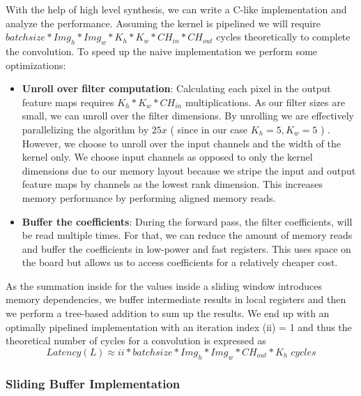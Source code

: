 With the help of high level synthesis, we can write a C-like implementation and analyze the performance. Assuming the kernel is pipelined we will require $ batch size * Img_h * Img_w * K_h * K_w * CH_{in} * CH_{out}  $ cycles theoretically to complete the convolution. To speed up the naive implementation we perform some optimizations:

\begin{itemize}
\item
\textbf{Unroll over filter computation}: Calculating each pixel in the output feature maps requires $ K_h * K_w * CH_{in} $ multiplications. As our filter sizes are small, we can unroll over the filter dimensions. By unrolling we are effectively parallelizing the algorithm by $ \mathit{25x} $ ( since in our case $ K_h = 5, K_w=5 $ ) . However, we choose to unroll over the input channels and the width of the kernel only. We choose input channels as opposed to only the kernel dimensions due to our memory layout because we stripe the input and  output feature maps by channels as the lowest rank dimension. This increases memory performance by performing aligned memory reads. 

\item
\textbf{Buffer the coefficients}: During the forward pass, the filter coefficients, will be read multiple times.  For that, we can reduce the amount of memory reads and buffer the coefficients in low-power and fast registers. This uses space on the board but allows us to access coefficients for a relatively cheaper cost.
\end{itemize}

As the summation inside for the values inside a sliding window introduces memory dependencies, we buffer intermediate results in local registers and then we perform a tree-based addition to sum up the results. We end up with an  optimally pipelined implementation with an iteration index (ii) = 1 and thus the theoretical number of cycles for a convolution is expressed as 
\begin{equation}
Latency (L)  \approx ii * batch size * Img_h * Img_w * CH_{out} * K_h  \; cycles
\end{equation}

\newpage




\subsubsection{Sliding Buffer Implementation}

